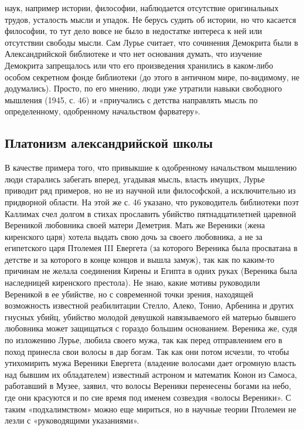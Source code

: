 наук, например истории, философии, наблюдается отсутствие оригинальных
трудов,  усталость мысли  и упадок.  Не берусь  судить об  истории, но
что  касается  философии, то  тут  дело  вовсе  не было  в  недостатке
интереса к  ней или отсутствии  свободы мысли. Сам Лурье  считает, что
сочинения  Демокрита  были  в  Александрийской библиотеке  и  что  нет
основания  думать,  что изучение  Демокрита  запрещалось  или что  его
произведения хранились в каком-либо  особом секретном фонде библиотеки
(до этого в античном мире, по-видимому, не додумались). Просто, по его
мнению, люди уже  утратили навыки свободного мышления (1945,  с. 46) и
«приучались с  детства направлять мысль по  определенному, одобренному
начальством фарватеру».

\subsection{Платонизм александрийской школы}

В  качестве  примера того,  что  привыкшие  к одобренному  начальством
мышлению  люди  старались  забегать  вперед,  угадывая  мысль,  власть
имущих, Лурье приводит ряд примеров, но не из научной или философской,
а исключительно из  придворной области. На этой же с.  46 указано, что
руководитель библиотеки поэт Каллимах  счел долгом в стихах прославить
убийство  пятнадцатилетней царевной  Вереникой любовника  своей матери
Деметрия. Мать же  Вереники (жена киренского царя)  хотела выдать свою
дочь  за своего  любовника,  а  не за  египетского  царя Птолемея  III
Евергета (за которого Вереника была просватана в детстве и за которого
в конце концов и вышла замуж),  так как по каким-то причинам не желала
соединения Кирены  и Египта в  одних руках (Вереника  была наследницей
киренского  престола). Не  знаю, какие  мотивы руководили  Вереникой в
ее  убийстве, но  с  современной точки  зрения, находящей  возможность
известной реабилитации Стелло, Алеко, Тонио, Арбенина и других гнусных
убийц,  убийство молодой  девушкой  навязываемого  ей матерью  бывшего
любовника  может защищаться  с  гораздо  большим основанием.  Вереника
же,  судя  по изложению  Лурье,  любила  своего  мужа, так  как  перед
отправлением его в поход принесла свои волосы в дар богам. Так как они
потом исчезли,  то чтобы утихомирить мужа  Вереники Евергета (владение
волосами  дает огромную  власть над  бывшим их  обладателем) известный
астроном  и математик  Конон из  Самоса, работавший  в Музее,  заявил,
что  волосы Вереники  перенесены  богами на  небо,  где они  красуются
и  по  сие время  под  именем  созвездия  «волосы Вереники».  С  таким
«подхалимством» можно  еще мириться, но  в научные теории  Птолемеи не
лезли с «руководящими указаниями».

